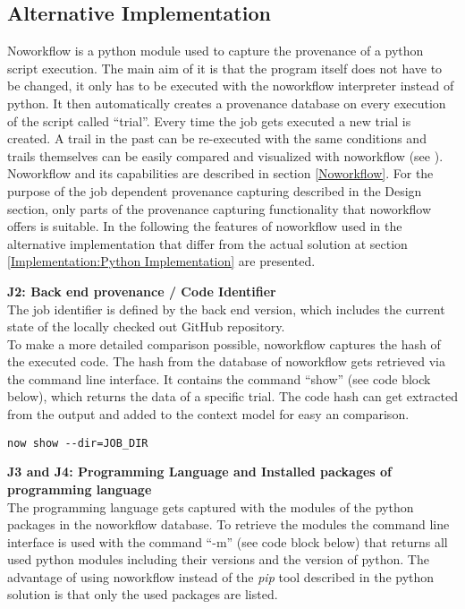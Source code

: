 \documentclass[draft,final]{vutinfth} %
\begin{document}
\subsection{Alternative Implementation}\label{Implementation:Noworkflow Implementation}
Noworkflow is a python module used to capture the provenance of a python script execution. The main aim of it is that the program itself does not have to be changed, it only has to be executed with the noworkflow interpreter instead of python. It then automatically creates a provenance database on every execution of the script called “trial”. Every time the job gets executed a new trial is created. A trail in the past can be re-executed with the same conditions and trails themselves can be easily compared and visualized with noworkflow (see \cite{c9e0604becba42af96a9cb0a6f60018b}). Noworkflow and its capabilities are described in section \ref{Noworkflow}. 
For the purpose of the job dependent provenance capturing described in the Design section, only parts of the provenance capturing functionality that noworkflow offers is suitable. In the following the features of noworkflow used in the alternative implementation that differ from the actual solution at section \ref{Implementation:Python Implementation} are presented.    


\textbf{J2: Back end provenance / Code Identifier} \\
The job identifier is defined by the back end version, which includes the current state of the locally checked out GitHub repository.\\
To make a more detailed comparison possible, noworkflow captures the hash of the executed code. The hash from the database of noworkflow gets retrieved via the command line interface. It contains the command “show” (see code block below), which returns the data of a specific trial. The code hash can get extracted from the output and added to the context model for easy an comparison. 

\begin{lstlisting}[frame=single]
now show --dir=JOB_DIR
\end{lstlisting}

\textbf{J3 and J4: Programming Language and  Installed packages of programming language} \\
The programming language gets captured with the modules of the python packages in the noworkflow database. To retrieve the modules the command line interface is used with the command “-m” (see code block below) that returns all used python modules including their versions and the version of python. The advantage of using noworkflow instead of the \textit{pip} tool described in the python solution is that only the used packages are listed.
\end{document}
